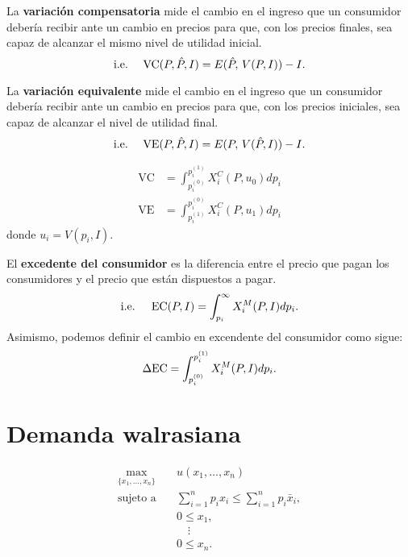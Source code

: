 \documentclass[8pt,a4paper]{extarticle}
\begin{document}
\begin{multicols}{3}
\begin{boxdef}
	La \textbf{variación compensatoria} mide el cambio en el ingreso que un consumidor debería recibir ante un cambio en precios para que, con los precios finales, sea capaz de alcanzar el mismo nivel de utilidad inicial.
	\[
		\text{\normalfont i.e.}\quad \text{ \normalfont VC} (P, \hat{P}, I) = E(\hat{P}, \, V(P, I)) - I
	.\] 
\end{boxdef}

\begin{boxdef}
	La \textbf{variación equivalente} mide el cambio en el ingreso que un consumidor debería recibir ante un cambio en precios para que, con los precios iniciales, sea capaz de alcanzar el nivel de utilidad final.
	\[
		\text{\normalfont i.e.}\quad \text{ \normalfont VE} (P, \hat{P}, I) = E(P, \, V(\hat{P}, I)) - I
	.\] 
\end{boxdef}

\begin{boxtheo}
	\begin{equation*}
	\begin{aligned}
		\text{VC} & = \int_{p_i^{(0)}}^{p_i^{(1)}} X_i^C (P, u_0) dp_i\\
		\text{VE} & = \int_{p_i^{(1)}}^{p_i^{(0)}} X_i^C (P, u_1) dp_i
	\end{aligned}
	\end{equation*}
	donde $u_i = V(p_i, I)$.
\end{boxtheo}

\begin{boxdef}
	El \textbf{excedente del consumidor} es la diferencia entre el precio que pagan los consumidores y el precio que están dispuestos a pagar.
	\[
		\text{\normalfont i.e. \quad EC}(P, I) = \int_{p_i}^{\infty} X_i^M (P, I) dp_i
	.\]
	Asimismo, podemos definir el cambio en excendente del consumidor como sigue:
	\[
		\Delta \text{\normalfont EC} = \int_{p_i^{(0)}}^{p_i^{(1)}} X_i^M (P, I) dp_i
	.\] 
\end{boxdef}

\newpage

\section{Demanda walrasiana}

\begin{equation*}
\begin{aligned}
	\max_{\{x_1, \ldots, x_n\}}\	  & u(x_1, \ldots, x_n) \\
	\text{sujeto a} \quad & \sum_{i=1}^{n} p_i x_i \le \sum_{i=1}^{n} p_i \bar{x}_i, \\
						  & 0 \le x_1, \\
						  & \quad \vdots \\
						  & 0 \le x_n.
\end{aligned}
\end{equation*}


\end{multicols}
\end{document}
